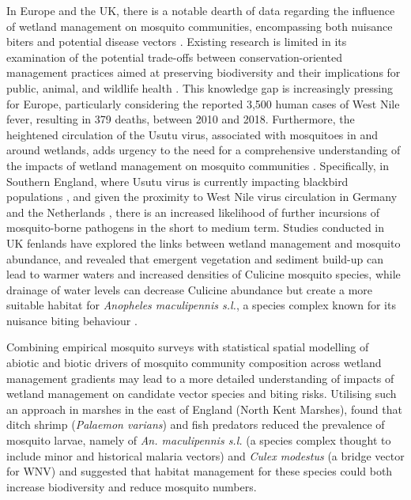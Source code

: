 \documentclass[lineno,sn-basic]{sn-jnl}%
\begin{document}
In Europe  and the UK, there is a notable dearth of data regarding the influence of wetland management on mosquito communities, encompassing both nuisance biters and potential disease vectors  \citep{hawkesWetlandMosquitoSurvey2020}. Existing research is limited in its examination of the potential trade-offs between conservation-oriented management practices aimed at preserving biodiversity and their implications for public, animal, and wildlife health \citep{martinouCallArmsSetting2020}. This knowledge gap is increasingly pressing for Europe, particularly considering the reported 3,500 human cases of West Nile fever, resulting in 379 deaths, between 2010 and 2018. Furthermore, the heightened circulation of the Usutu virus, associated with mosquitoes in and around wetlands, adds urgency to the need for a comprehensive understanding of the impacts of wetland management on mosquito communities \citep{ferragutiEffectsLandscapeAnthropization2016}. Specifically, in Southern England, where Usutu virus is currently impacting blackbird populations \citep{follyEvidenceOverwinteringAutochthonous2022a}, and given the proximity to West Nile virus circulation in Germany and the Netherlands \citep{bakonyiWestNileVirus2020}, there is an increased likelihood of further incursions of mosquito-borne pathogens in the short to medium term. Studies conducted in UK fenlands have explored the links between wetland management and mosquito abundance, and revealed that emergent vegetation and sediment build-up can lead to warmer waters and increased densities of Culicine mosquito species, while drainage of water levels can decrease Culicine abundance but create a more suitable habitat for \textit{Anopheles maculipennis s.l.}, a species complex known for its nuisance biting behaviour \citep{medlockSeasonalDynamicsHabitat2015a}.

Combining empirical mosquito surveys with statistical spatial modelling of abiotic and biotic drivers of mosquito  community composition across wetland management gradients may lead to a more detailed understanding of impacts of wetland management on candidate vector species and biting risks. Utilising such an approach in marshes in the east of England (North Kent Marshes), \cite{goldingIdentifyingBioticInteractions2015a} found that ditch shrimp (\textit{Palaemon varians}) and fish predators reduced the prevalence of mosquito larvae, namely of \textit{An. maculipennis s.l.} (a species complex thought to include minor and historical malaria vectors) and \textit{Culex modestus} (a bridge vector for WNV) and suggested that habitat management for these species could both increase biodiversity and reduce mosquito numbers. 
\end{document}
